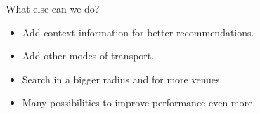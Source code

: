\documentclass{beamer}
\begin{document}
\begin{frame}{What else can we do?}
\begin{itemize}
\item Add context information for better recommendations.
\item Add other modes of transport.
\item Search in a bigger radius and for more venues.
\item Many possibilities to improve performance even more.
\end{itemize}
\end{frame}
\end{document}
